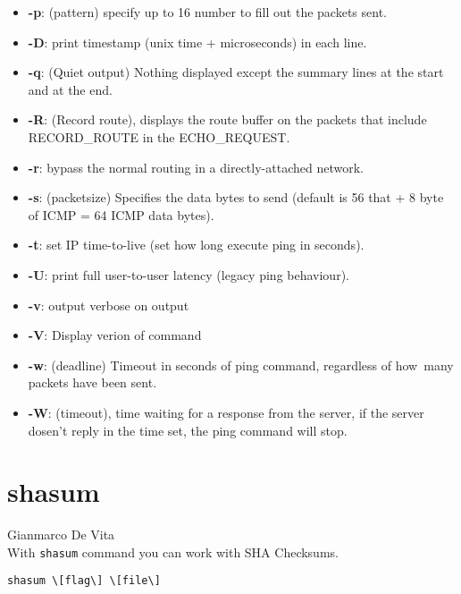 \documentclass[hidelinks,12pt,a4paper,numbers=enddot]{scrartcl}
\begin{document}
\begin{itemize}
    \item \textbf{-p}: (pattern) specify up to 16 number to fill out the packets sent.
    \item \textbf{-D}: print timestamp (unix time + microseconds) in each line.
    \item \textbf{-q}: (Quiet output) Nothing  displayed except the summary lines at the start
        and at the end.
    
    \item \textbf{-R}: (Record route), displays the route buffer on the packets that include
        RECORD\_ROUTE in the ECHO\_REQUEST.
    
    \item \textbf{-r}: bypass the normal routing in a directly-attached network.
    \item \textbf{-s}: (packetsize) Specifies the data bytes to send (default is 56 that
        + 8 byte of ICMP = 64 ICMP data bytes).
    
    \item \textbf{-t}: set IP time-to-live (set how long execute ping in seconds).
    \item \textbf{-U}: print full user-to-user latency (legacy ping behaviour).
    \item \textbf{-v}: output verbose on output
    \item \textbf{-V}: Display verion of command
    \item \textbf{-w}: (deadline) Timeout in seconds of ping command, regardless of how\
        many packets have been sent.
    
    \item \textbf{-W}: (timeout), time waiting for a response from the server, if the server
        dosen't reply in the time set, the ping command will stop.
    
\end{itemize}

\section{shasum}


\large Gianmarco De Vita \normalsize\\



With \texttt{shasum} command you can work with SHA Checksums.

\begin{verbatim}
shasum \[flag\] \[file\]
\end{verbatim}
\end{document}
